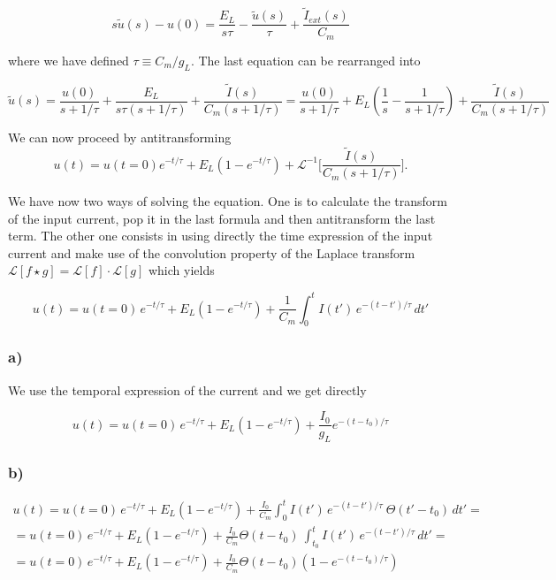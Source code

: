 \documentclass[11pt]{article}
\begin{document}
\begin{equation*}
    s \tilde u(s) - u(0) = \frac{E_L}{s\tau} - \frac{\tilde u(s)}{\tau} + \frac{\tilde I_{ext}(s)}{C_m}
\end{equation*}

where we have defined $\tau \equiv C_m/g_L$. The last equation can be
rearranged into

\begin{equation*}
    \tilde u(s) = \frac{u(0)}{s+1/\tau} + \frac{E_L}{s \tau (s+1/\tau)} + \frac{\tilde I(s)}{C_m(s+1/\tau)} = \frac{u(0)}{s+1/\tau} +  E_L \left(\frac{1}{s} - \frac{1}{s + 1/\tau} \right)+ \frac{\tilde I(s)}{C_m(s+1/\tau)}
\end{equation*}

    We can now proceed by antitransforming \[
    u(t) = u(t=0) e^{-t/\tau} + E_L \left(1 - e^{-t/\tau}\right) + \mathcal{L}^{-1} \biggl  [\frac{\tilde I(s)}{C_m(s+1/\tau)}\biggr].
\]

    We have now two ways of solving the equation. One is to calculate the
transform of the input current, pop it in the last formula and then
antitransform the last term. The other one consists in using directly
the time expression of the input current and make use of the convolution
property of the Laplace transform
$\mathcal{L} [f \star g] = \mathcal{L}[f] \cdot \mathcal{L}[g]$ which
yields

\begin{equation*}
    u(t) = u(t=0) \, e^{-t/\tau} + E_L \left(1 - e^{-t/\tau}\right) + \frac{1}{C_m} \int_0^t I(t') \, e^{-(t-t')/\tau} \, dt'
\end{equation*}

    \subsubsection*{a)}\label{a}

We use the temporal expression of the current and we get directly

\begin{equation}
    u(t) = u(t=0) \, e^{-t/\tau} + E_L \left(1 - e^{-t/\tau}\right) + \frac{I_0}{g_L} e^{-(t-t_0)/\tau}
\end{equation}

    \subsubsection*{b)}\label{b}

\begin{gather*}
    u(t) = u(t=0) \, e^{-t/\tau} + E_L \left(1 - e^{-t/\tau}\right) + \frac{I_0}{C_m} \int_{0}^t I(t') \, e^{-(t-t')/\tau} \ \Theta(t'-t_0) \, dt' = \\ 
    = u(t=0) \, e^{-t/\tau} + E_L \left(1 - e^{-t/\tau}\right) + \frac{I_0}{C_m} \Theta(t-t_0) \ \int_{t_0}^t I(t') \, e^{-(t-t')/\tau} \, dt' = \\
    = u(t=0) \, e^{-t/\tau} + E_L \left(1 - e^{-t/\tau}\right) + \frac{I_0}{C_m} \Theta(t-t_0) \left(1 - e^{-(t-t_0)/\tau}\right)
\end{gather*}
\end{document}
